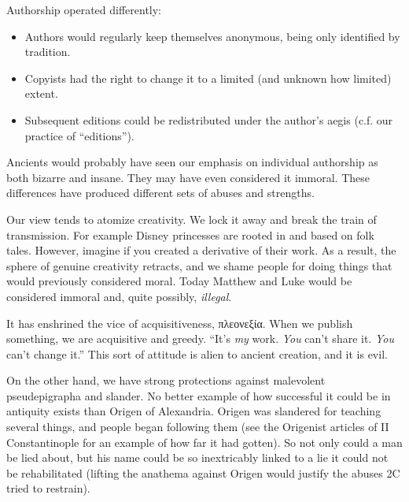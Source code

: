\documentclass{beamer}
\begin{document}
\begin{frame}
  Authorship operated differently:\pause
  \begin{itemize}
	\item Authors would regularly keep themselves anonymous, being only identified by tradition.\pause
	\item Copyists had the right to change it to a limited (and unknown how limited) extent.\pause
	\item Subsequent editions could be redistributed under the author's aegis (c.f. our practice of ``editions'').
  \end{itemize}
\end{frame}

\begin{frame}
  Ancients would probably have seen our emphasis on individual authorship as both bizarre and insane.
  They may have even considered it immoral.
  These differences have produced different sets of abuses and strengths.
\end{frame}

\begin{frame}
  Our view tends to atomize creativity.
  We lock it away and break the train of transmission.
  For example Disney princesses are rooted in and based on folk tales.
  However, imagine if you created a derivative of their work.
  As a result, the sphere of genuine creativity retracts, and we shame people for doing things that would previously considered moral.
  Today Matthew and Luke would be considered immoral and, quite possibly, \emph{illegal}.
\end{frame}

\begin{frame}
  It has enshrined the vice of acquisitiveness, \textgreek{πλεονεξία}.
  When we publish something, we are acquisitive and greedy.
  ``It's \emph{my} work.
  \emph{You} can't share it.
  \emph{You} can't change it.''
  This sort of attitude is alien to ancient creation, and it is evil.
\end{frame}

\begin{frame}
  On the other hand, we have strong protections against malevolent pseudepigrapha and slander.
  No better example of how successful it could be in antiquity exists than Origen of Alexandria.
  Origen was slandered for teaching several things, and people began following them (see the Origenist articles of II Constantinople for an example of how far it had gotten).
  So not only could a man be lied about, but his name could be so inextricably linked to a lie it could not be rehabilitated (lifting the anathema against Origen would justify the abuses 2C tried to restrain).
\end{frame}
\end{document}
